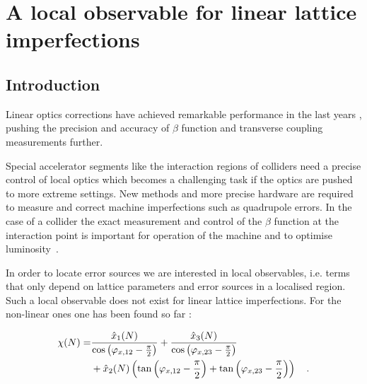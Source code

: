 \chapter{A local observable for linear lattice imperfections}
\label{ch_localobs}

\newcommand{\combtoangle}[3]{
  $\SI{#1}{\degree} - \SI{#2}{\degree} - \SI{#3}{\degree}$
}

\newcommand{\noiserms}{$0.7\times 10^{-3}\times 2\pi$ rad{}}
\newcommand{\highnoise}{$1.8\times 10^{-3}\times 2\pi$ rad{}}

\newcommand{\maxfigwidth}{8.5cm}


\section{Introduction}

Linear optics corrections have achieved remarkable performance in the last years
\cite{Tomas2017, Tomas2012, Persson2017, Aiba2013, Sagan2000, Borer1983, Langner2015},
pushing the precision and accuracy of $\beta$ function and transverse coupling
measurements further.

Special accelerator segments like the interaction regions of colliders
need a precise control of local optics which becomes a challenging task
if the optics are pushed to more extreme settings. New methods and more
precise hardware are required to measure and correct machine
imperfections such as quadrupole errors. In the case of a collider the
exact measurement and control of the $\beta$ function at the interaction point is important for operation of
the machine and to optimise luminosity~\cite{jaime}.


In order to locate error sources we are interested in local
observables, i.e. terms that only depend on lattice parameters and error sources in a localised
region. Such a local observable does not exist for linear lattice imperfections. For the non-linear
ones one has been found so far
\cite{Tomas2005, Franchi2007}: 

\begin{align}
  \chi(N) =& \frac{\hat{x}_1(N)}{\cos \left( \varphi_{x,12} - \frac{\pi}{2} \right)} 
  + \frac{\hat{x}_3(N)}{\cos\left( \varphi_{x,23}-\frac{\pi}{2} \right)} \notag \\
  &+ \hat{x}_2 (N) \left(
    \tan\left( \varphi_{x,12}-\frac{\pi}{2} \right)
    + \tan\left( \varphi_{x,23}-\frac{\pi}{2} \right)
  \right)
  \quad .
  \label{eq_chi}
\end{align}

